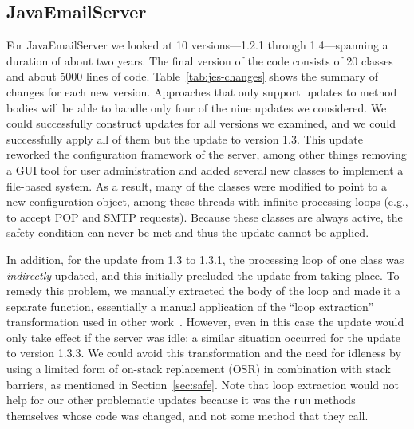 \subsection{JavaEmailServer}
\label{subsec:jes}

For JavaEmailServer we looked at 10 versions---1.2.1 through
1.4---spanning a duration of about two years.  The final version of
the code consists of 20 classes and about 5000 lines of code.
Table~\ref{tab:jes-changes} shows the summary of changes for each new
version. Approaches that only support updates to method bodies will be able
to handle only four of the nine updates we considered. We
could successfully construct updates for all versions we examined, and
we could successfully apply all of them but the update to version 1.3.  This
update reworked the configuration framework of the server, among other
things removing a GUI tool for user administration and added several
new classes to implement a file-based system.  As a result, many of
the classes were modified to point to a new configuration object,
among these threads with infinite processing loops (e.g., to accept
POP and SMTP requests).  Because these classes are always active, the
safety condition can never be met and thus the update cannot be
applied.

In addition, for the update from 1.3 to 1.3.1, the processing loop of
one class was \emph{indirectly} updated, and this initially precluded
the update from taking place.  To remedy this problem, we manually
extracted the body of the loop and made it a separate function,
essentially a manual application of the ``loop extraction''
transformation used in other work~\cite{neamtiu06dsu}.  However, even
in this case the update would only take effect if the server was idle;
a similar situation occurred for the update to version 1.3.3.  We
could avoid this transformation and the need for idleness by using a
limited form of on-stack replacement 
(OSR) in combination with stack barriers, as mentioned in
Section~\ref{sec:safe}.  Note that loop extraction would 
not help for our other problematic updates because it was the
\texttt{run} methods themselves whose code was changed, and not some
method that they call.


